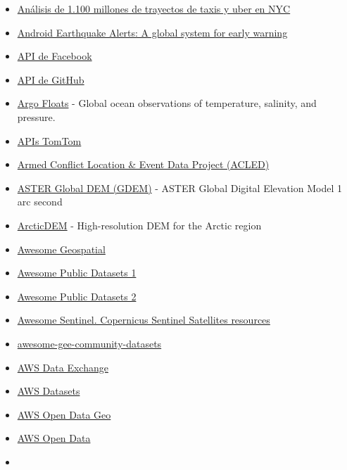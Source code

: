 \documentclass[
  letterpaper,
  DIV=11,
  numbers=noendperiod]{scrartcl}
\begin{document}
\begin{itemize}
{  data 2018}
\item
  \href{https://github.com/toddwschneider/nyc-taxi-data}{Análisis de
  1.100 millones de trayectos de taxis y uber en NYC}
\item
  \href{https://research.google/blog/android-earthquake-alerts-a-global-system-for-early-warning/}{Android
  Earthquake Alerts: A global system for early warning}
\item
  \href{https://developers.facebook.com/docs/graph-api}{API de Facebook}
\item
  \href{https://developer.github.com/v3/}{API de GitHub}
\item
  \href{https://argo.ucsd.edu/}{Argo Floats} - Global ocean observations
  of temperature, salinity, and pressure.
\item
  \href{https://developer.tomtom.com/api-explorer-index/documentation/product-information/introduction}{APIs
  TomTom}
\item
  \href{https://acleddata.com/}{Armed Conflict Location \& Event Data
  Project (ACLED)}
\item
  \href{https://lpdaac.usgs.gov/products/astgtmv003/}{ASTER Global DEM
  (GDEM)} - ASTER Global Digital Elevation Model 1 arc second
\item
  \href{https://www.pgc.umn.edu/data/arcticdem/}{ArcticDEM} -
  High-resolution DEM for the Arctic region
\item
  \href{https://github.com/sacridini/Awesome-Geospatial}{Awesome
  Geospatial}
\item
  \href{https://github.com/dipanjanS/awesome-public-datasets}{Awesome
  Public Datasets 1}
\item
  \href{https://github.com/awesomedata/awesome-public-datasets}{Awesome
  Public Datasets 2}
\item
  \href{https://github.com/Fernerkundung/awesome-sentinel}{Awesome
  Sentinel. Copernicus Sentinel Satellites resources}
\item
  \href{https://github.com/samapriya/awesome-gee-community-datasets}{awesome-gee-community-datasets}
\item
  \href{https://docs.aws.amazon.com/data-exchange/}{AWS Data Exchange}
\item
  \href{https://registry.opendata.aws/}{AWS Datasets}
\item
  \href{https://github.com/opengeos/aws-open-data-geo}{AWS Open Data
  Geo}
\item
  \href{https://github.com/opengeos/aws-open-data}{AWS Open Data}
\item

\end{itemize}
\end{document}
